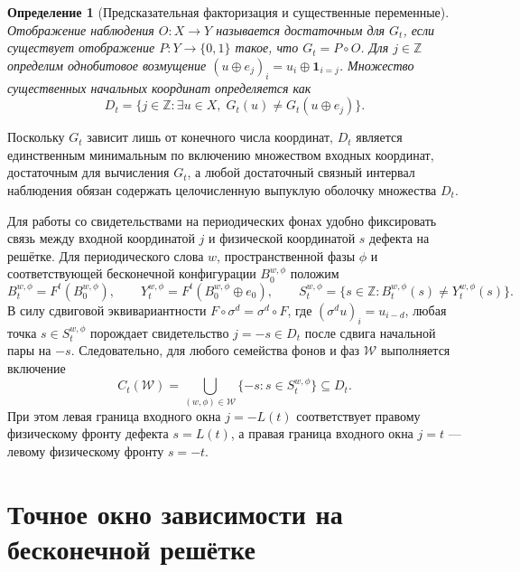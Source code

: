 \documentclass[11pt, a4paper]{article}
\newtheorem{definition}[theorem]{Определение}
\begin{document}
\begin{definition}[Предсказательная факторизация и существенные переменные]
Отображение наблюдения $O : X \to Y$ называется достаточным для $G_t$, если существует отображение $P : Y \to \{0, 1\}$ такое, что $G_t = P \circ O$. Для $j \in \mathbb{Z}$ определим однобитовое возмущение $(u \oplus e_j)_i = u_i \oplus \mathbf{1}_{i=j}$. Множество существенных начальных координат определяется как
\begin{equation}\label{eq:essential_set}
D_t = \{ j \in \mathbb{Z} : \exists u \in X,\; G_t(u) \ne G_t(u \oplus e_j) \}.
\end{equation}
\end{definition}

Поскольку $G_t$ зависит лишь от конечного числа координат, $D_t$ является единственным минимальным по включению множеством входных координат, достаточным для вычисления $G_t$, а любой достаточный связный интервал наблюдения обязан содержать целочисленную выпуклую оболочку множества $D_t$.

Для работы со свидетельствами на периодических фонах удобно фиксировать связь между входной координатой $j$ и физической координатой $s$ дефекта на решётке. Для периодического слова $w$, пространственной фазы $\phi$ и соответствующей бесконечной конфигурации $B_0^{w,\phi}$ положим
\begin{equation}\label{eq:diff_support}
B_t^{w,\phi} = F^t(B_0^{w,\phi}), \qquad
Y_t^{w,\phi} = F^t(B_0^{w,\phi} \oplus e_0), \qquad
S_t^{w,\phi} = \{ s \in \mathbb{Z} : B_t^{w,\phi}(s) \ne Y_t^{w,\phi}(s) \}.
\end{equation}
В силу сдвиговой эквивариантности $F \circ \sigma^d = \sigma^d \circ F$, где $(\sigma^d u)_i = u_{i-d}$, любая точка $s \in S_t^{w,\phi}$ порождает свидетельство $j = -s \in D_t$ после сдвига начальной пары на $-s$. Следовательно, для любого семейства фонов и фаз $\mathcal{W}$ выполняется включение
\begin{equation}\label{eq:coverage_bridge}
C_t(\mathcal{W}) = \bigcup_{(w,\phi) \in \mathcal{W}} \{ -s : s \in S_t^{w,\phi} \} \subseteq D_t.
\end{equation}
При этом левая граница входного окна $j = -L(t)$ соответствует правому физическому фронту дефекта $s = L(t)$, а правая граница входного окна $j = t$ — левому физическому фронту $s = -t$.

\section{Точное окно зависимости на бесконечной решётке}
\end{document}
